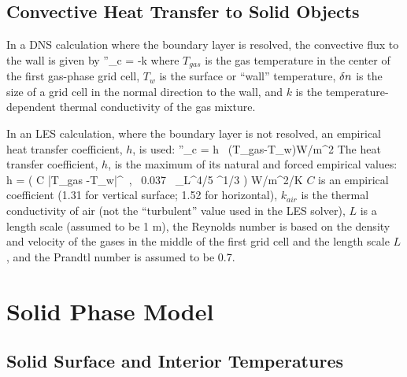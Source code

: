\documentclass[11pt]{book}
\begin{document}
\subsection{Convective Heat Transfer to Solid Objects}

In a DNS calculation where the boundary layer is resolved, the convective flux to the wall
is given by
\be
\dq''_c = -k 
\ee
where $T_{gas}$ is the gas temperature in the center of the first gas-phase grid cell,
$T_w$ is the surface or ``wall'' temperature, $\delta n$ is the
size of a grid cell in the normal direction to the wall, and $k$ is
the temperature-dependent thermal conductivity of the gas mixture.

In an LES calculation, where the boundary layer is not resolved, an empirical heat transfer coefficient, $h$, is used: \be \dq''_c = h \,
(T_{gas}-T_w)\quad \hbox{W/m}^2 \ee The heat transfer coefficient, $h$, is the maximum of its natural and forced empirical values:
 \be h = \max \left( C |T_{gas} -T_w|^\ot \, , \,  0.037 \, \RE_L^{4/5} \PR^{1/3} \right)  \quad \hbox{W/m}^2\hbox{/K}  \ee
$C$ is an empirical coefficient (1.31 for vertical surface; 1.52 for horizontal), $k_{air}$ is
the thermal conductivity of air (not the ``turbulent''
value used in the LES solver), $L$ is a length scale (assumed to be 1 m), the Reynolds number
is based on the density and velocity of the gases in
the middle of the first grid cell and the length scale $L$, and the Prandtl number is assumed to be 0.7.



\clearpage
\section{Solid Phase Model}

\subsection{Solid Surface and Interior Temperatures}
\end{document}
